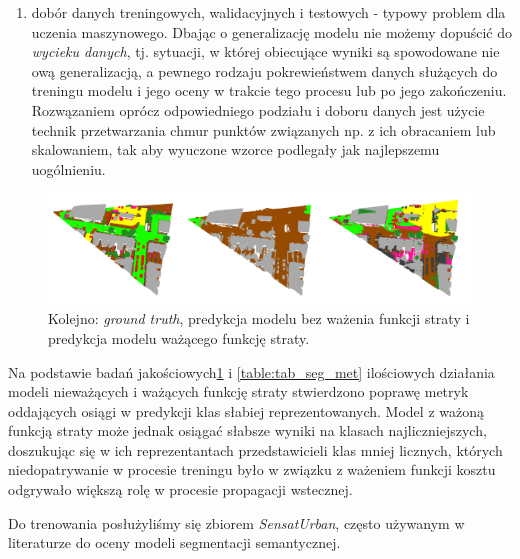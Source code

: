 \begin{enumerate}
\begin{enumerate}
    \end{enumerate}
    \item dobór danych treningowych, walidacyjnych i testowych - typowy problem dla uczenia maszynowego. Dbając o generalizację modelu nie możemy dopuścić do \textit{wycieku danych}, tj. sytuacji, w której obiecujące wyniki są spowodowane nie ową generalizacją, a pewnego rodzaju pokrewieństwem danych służących do treningu modelu i jego oceny w trakcie tego procesu lub po jego zakończeniu. Rozwązaniem oprócz odpowiedniego podziału i doboru danych jest użycie technik przetwarzania chmur punktów związanych np. z ich obracaniem lub skalowaniem, tak aby wyuczone wzorce podlegały jak najlepszemu uogólnieniu.
\end{enumerate}

\begin{figure}[!h]
    \centering
    \includegraphics[width=1.0\linewidth]{img/segmentacja/weighted_loss.png}
    \caption{Kolejno: \textit{ground truth}, predykcja modelu bez ważenia funkcji straty i predykcja modelu ważącego funkcję straty.}
    \label{fig:seg_wei}
\end{figure}

Na podstawie badań jakościowych\ref{fig:seg_wei} i \ref{table:tab_seg_met} ilościowych działania modeli nieważących i ważących funkcję straty stwierdzono poprawę metryk oddających osiągi w predykcji klas słabiej reprezentowanych. Model z ważoną funkcją straty może jednak osiągać słabsze wyniki na klasach najliczniejszych, doszukując się w ich reprezentantach przedstawicieli klas mniej licznych, których niedopatrywanie w procesie treningu było w związku z ważeniem funkcji kosztu odgrywało większą rolę w procesie propagacji wstecznej.

Do trenowania posłużyliśmy się zbiorem \textit{SensatUrban}\cite{hu2022sensaturban}, często używanym w literaturze do oceny modeli segmentacji semantycznej.

